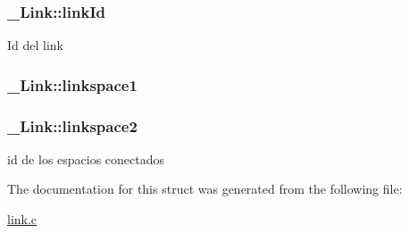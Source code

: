 \subsubsection[{\texorpdfstring{link\+Id}{linkId}}]{ \+\_\+\+Link\+::link\+Id}\hypertarget{struct__Link_a3c2eb94d5f272bf373c113a868e3d367}{}\label{struct__Link_a3c2eb94d5f272bf373c113a868e3d367}
Id del link 
\subsubsection[{\texorpdfstring{linkspace1}{linkspace1}}]{ \+\_\+\+Link\+::linkspace1}\hypertarget{struct__Link_a851b2cb675c25aaa73ebbaa58b8db1a2}{}\label{struct__Link_a851b2cb675c25aaa73ebbaa58b8db1a2}
\subsubsection[{\texorpdfstring{linkspace2}{linkspace2}}]{ \+\_\+\+Link\+::linkspace2}\hypertarget{struct__Link_aac79e76abc5512cd08a381eb835d59f0}{}\label{struct__Link_aac79e76abc5512cd08a381eb835d59f0}
id de los espacios conectados 

The documentation for this struct was generated from the following file\+:\begin{DoxyCompactItemize}
\item 
\hyperlink{link_8c}{link.\+c}\end{DoxyCompactItemize}
